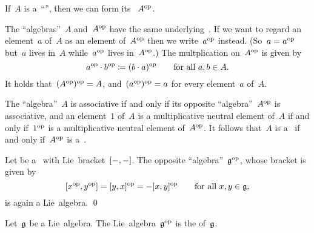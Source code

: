 \begin{recall}
	If~$A$ is a~\enquote{\algebra{$\kf$}}, then we can form its ~$A^{\mathrm{op}}$.

	The \enquote{algebras}~$A$ and~$A^{\mathrm{op}}$ have the same underlying~\vectorspace{$\kf$}.
	If we want to regard an element~$a$ of~$A$ as an element of~$A^{\mathrm{op}}$ then we write~$a^{\mathrm{op}}$ instead.
	(So~$a = a^{\mathrm{op}}$ but~$a$ lives in~$A$ while~$a^{\mathrm{op}}$ lives in~$A^{\mathrm{op}}$.)
	The multplication on~$A^{\mathrm{op}}$ is given by
	\[
		a^{\mathrm{op}} \cdot b^{\mathrm{op}}
		\coloneqq
		(b \cdot a)^{\mathrm{op}}
		\qquad
		\text{for all~$a, b \in A$.}
	\]
	It holds that~$(A^{\mathrm{op}})^{\mathrm{op}} = A$, and~$(a^{\mathrm{op}})^{\mathrm{op}} = a$ for every element~$a$ of~$A$.

	The \enquote{algebra}~$A$ is associative if and only if its opposite \enquote{algebra}~$A^{\mathrm{op}}$ is associative, and an element~$1$ of~$A$ is a multiplicative neutral element of~$A$ if and only if~$1^{\mathrm{op}}$ is a multiplicative neutral element of~$A^{\mathrm{op}}$.
	It follows that~$A$ is a~{\algebra{$\kf$}} if and only if~$A^{\mathrm{op}}$ is a~\algebra{$\kf$}.
\end{recall}


\begin{proposition}
	Let be a~\liealgebra{$\kf$} with Lie~bracket~$[-, -]$.
	The opposite \enquote{algebra}~$\mathfrak{g}^{\mathrm{op}}$, whose bracket is given by
	\[
		[x^{\mathrm{op}}, y^{\mathrm{op}}]
		=
		[y,x]^{\mathrm{op}}
		=
		-[x,y]^{\mathrm{op}}
		\qquad
		\text{for all~$x, y \in \mathfrak{g}$,}
	\]
	is again a Lie~algebra.
	\qed
\end{proposition}


\begin{definition}
	Let~$\mathfrak{g}$ be a Lie~algebra.
	The Lie~algebra~$\mathfrak{g}^{\mathrm{op}}$ is the  of~$\mathfrak{g}$.
\end{definition}





